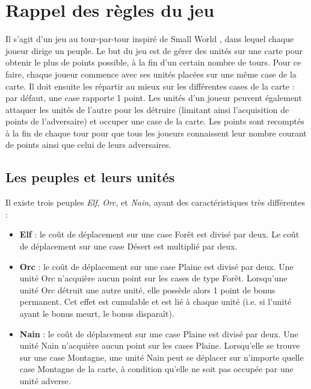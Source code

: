 \section{Rappel des règles du jeu}

Il s’agit d’un jeu au tour-par-tour inspiré de \og Small World \fg{}, dans lequel chaque joueur dirige un peuple. Le but du jeu est de gérer des unités sur une carte pour obtenir le plus de points possible, à la fin d’un certain nombre de tours. Pour ce faire, chaque joueur commence avec ses unités placées sur une même case de la carte. Il doit ensuite les répartir au mieux sur les différentes cases de la carte : par défaut, une case rapporte 1 point. Les unités d’un joueur peuvent également attaquer les unités de l'autre pour les détruire (limitant ainsi l’acquisition de points de l’adversaire) et occuper une case de la carte. Les points sont recomptés à la fin de chaque tour pour que tous les joueurs connaissent leur nombre courant de points ainsi que celui de leurs adversaires.

\subsection{Les peuples et leurs unités}

Il existe trois peuples \textit{Elf}, \textit{Orc}, et \textit{Nain}, ayant des caractéristiques très différentes :

\begin{itemize}

\item \textbf{Elf} :  le coût de déplacement sur une case Forêt est divisé par deux. Le coût de déplacement sur une case Désert est multiplié par deux.
\item \textbf{Orc} : le coût de déplacement sur une case Plaine est divisé par deux. Une unité Orc n’acquière aucun point sur les cases de type Forêt. Lorsqu’une unité Orc détruit une autre unité, elle possède alors 1 point de bonus permanent. Cet effet est cumulable et est lié à chaque unité (i.e. si l’unité ayant le bonus meurt, le bonus disparaît).
\item \textbf{Nain} :  le coût de déplacement sur une case Plaine est divisé par deux. Une unité Nain n’acquière aucun point sur les cases Plaine. Lorsqu’elle se trouve sur une case Montagne, une unité Nain peut se déplacer sur n’importe quelle case Montagne de la carte, à condition qu’elle ne soit pas occupée par une unité adverse.

\end{itemize}

